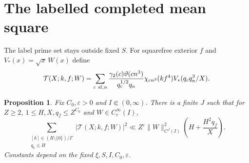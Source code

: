 \documentclass[11pt,a4paper]{article}
\numberwithin{equation}{section}
\newtheorem{proposition}[theorem]{Proposition}
\theoremstyle{definition}
\theoremstyle{remark}
\newcommand{\eps}{\varepsilon}
\begin{document}
\section{The labelled completed mean square}\label{sec:labels}
The label prime set stays outside fixed $S$. For squarefree exterior $f$ and $V_*(x)=\sqrt x\,W(x)$ define
\begin{equation}\label{eq:completed}
 \mathcal T(X;k,f;W)=\sum_{c\ {\rm sf},n}
 \frac{\gamma_2(c)\vartheta(cn^3)}{q_c^{1/2}q_n}
 \chi_{cn^3}(kf^4)V_*(q_cq_n^3/X).
\end{equation}

\begin{proposition}\label{prop:completed}
Fix $C_0,\eps>0$ and $I\Subset(0,\infty)$. There is a finite $J$ such that for $Z\ge2$, $1\le H,X,q_f\le Z^{C_0}$ and $W\in C_c^\infty(I)$,
\begin{equation}\label{eq:completedbound}
 \sum_{\substack{[k]\in(R\setminus\{0\})/\Gamma\\q_k\le H}}
 |\mathcal T(X;k,f;W)|^2
 \ll Z^\eps\|W\|_{C^J(I)}^2
                  \left(H+\frac{H^2q_f}{X}\right).
\end{equation}
Constants depend on the fixed $\xi,S,I,C_0,\eps$.
\end{proposition}
\end{document}
